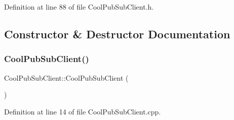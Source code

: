 Definition at line 88 of file Cool\+Pub\+Sub\+Client.\+h.



\subsection{Constructor \& Destructor Documentation}
\mbox{\label{class_cool_pub_sub_client_a2e54e36217bb0969b91b5dee9a27410f}} 
\subsubsection{\texorpdfstring{Cool\+Pub\+Sub\+Client()}{CoolPubSubClient()}\hspace{0.1cm}{\footnotesize\ttfamily [1/14]}}
{\footnotesize\ttfamily Cool\+Pub\+Sub\+Client\+::\+Cool\+Pub\+Sub\+Client (\begin{DoxyParamCaption}{ }\end{DoxyParamCaption})}



Definition at line 14 of file Cool\+Pub\+Sub\+Client.\+cpp.


